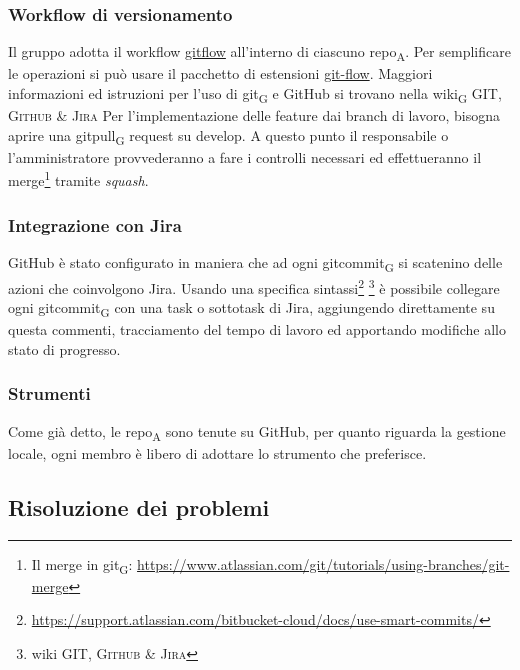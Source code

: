     \subsubsection{Workflow di versionamento}
        Il gruppo adotta il workflow \href{https://www.atlassian.com/git/tutorials/comparing-workflows/gitflow-workflow}{gitflow} all'interno di ciascuno \acrshort{repo}\textsubscript{A}. Per semplificare le operazioni si può usare il pacchetto di estensioni \href{http://danielkummer.github.io/git-flow-cheatsheet/}{git-flow}. Maggiori informazioni ed istruzioni per l'uso di \gls{git}\textsubscript{G} e GitHub si trovano nella \gls{wiki}\textsubscript{G} \textsc{GIT, Github \& Jira}
            Per l'implementazione delle feature dai branch di lavoro, bisogna aprire una \gls{gitpull}\textsubscript{G} request su develop. A questo punto il responsabile o l'amministratore provvederanno a fare i controlli necessari ed effettueranno il merge\footnote{Il merge in \gls{git}\textsubscript{G}: \url{https://www.atlassian.com/git/tutorials/using-branches/git-merge}} tramite \textit{squash}.

    \subsubsection{Integrazione con Jira}
    \label{jiraintegration}
        GitHub è stato configurato in maniera che ad ogni \gls{gitcommit}\textsubscript{G} si scatenino delle azioni che coinvolgono Jira. Usando una specifica sintassi\footnote{\url{https://support.atlassian.com/bitbucket-cloud/docs/use-smart-commits/}} \footnote{wiki \textsc{GIT, Github \& Jira}} è possibile collegare ogni \gls{gitcommit}\textsubscript{G} con una task o sottotask di Jira, aggiungendo direttamente su questa commenti, tracciamento del tempo di lavoro ed apportando modifiche allo stato di progresso.

    \subsubsection{Strumenti}
    Come già detto, le \acrshort{repo}\textsubscript{A} sono tenute su GitHub, per quanto riguarda la gestione locale, ogni membro è libero di adottare lo strumento che preferisce.


\subsection{Risoluzione dei problemi}
    \label{risoluzioneproblemi}
